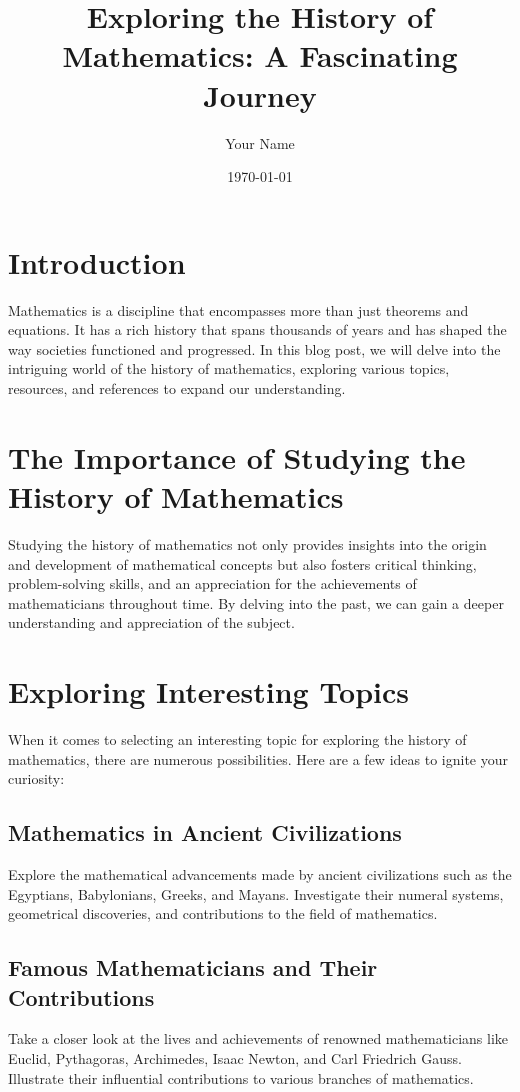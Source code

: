 \documentclass{article}
\begin{document}
\title{Exploring the History of Mathematics: A Fascinating Journey}
\author{Your Name}
\date{\today}

\maketitle

\section{Introduction}
Mathematics is a discipline that encompasses more than just theorems and equations. It has a rich history that spans thousands of years and has shaped the way societies functioned and progressed. In this blog post, we will delve into the intriguing world of the history of mathematics, exploring various topics, resources, and references to expand our understanding.

\section{The Importance of Studying the History of Mathematics}
Studying the history of mathematics not only provides insights into the origin and development of mathematical concepts but also fosters critical thinking, problem-solving skills, and an appreciation for the achievements of mathematicians throughout time. By delving into the past, we can gain a deeper understanding and appreciation of the subject.

\section{Exploring Interesting Topics}
When it comes to selecting an interesting topic for exploring the history of mathematics, there are numerous possibilities. Here are a few ideas to ignite your curiosity:

\subsection{Mathematics in Ancient Civilizations}
Explore the mathematical advancements made by ancient civilizations such as the Egyptians, Babylonians, Greeks, and Mayans. Investigate their numeral systems, geometrical discoveries, and contributions to the field of mathematics.

\subsection{Famous Mathematicians and Their Contributions}
Take a closer look at the lives and achievements of renowned mathematicians like Euclid, Pythagoras, Archimedes, Isaac Newton, and Carl Friedrich Gauss. Illustrate their influential contributions to various branches of mathematics.
\end{document}
